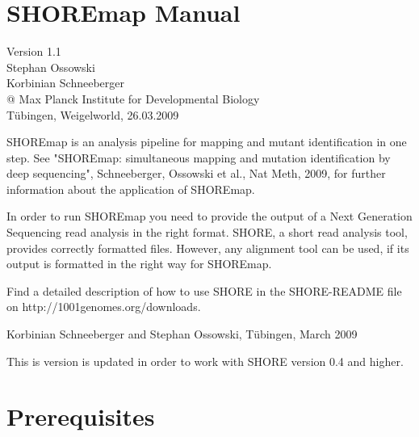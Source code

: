 \documentclass[a4paper,10pt]{scrartcl}
\begin{document}
\parindent 0pt
\parskip 10pt
\setlength{\textheight}{22cm}
\setlength{\headheight}{0.2cm}


\hspace{16cm}
\section*{\centering \huge SHOREmap Manual}
\setcounter{section}{0}
\vspace{.4cm}
\begin{center}
Version 1.1\\[1cm]

Stephan Ossowski\\
Korbinian Schneeberger\\[1cm]


@ Max Planck Institute for Developmental Biology\\
T\"ubingen, Weigelworld, 26.03.2009\\
\end{center}


\newpage
\vspace{.4cm}
\tableofcontents

\newpage

\vspace{.5cm}

SHOREmap is an analysis pipeline for mapping and mutant identification in one step. See "SHOREmap: simultaneous mapping and mutation identification by deep sequencing", Schneeberger, Ossowski et al., Nat Meth, 2009, for further information about the application of SHOREmap.

In order to run SHOREmap you need to provide the output of a Next Generation Sequencing read analysis in the right format. SHORE, a short read analysis tool, provides correctly formatted files. However, any alignment tool can be used, if its output is formatted in the right way for SHOREmap.

Find a detailed description of how to use SHORE in the SHORE-README file on http://1001genomes.org/downloads.

Korbinian Schneeberger and Stephan Ossowski, T\"ubingen, March 2009

This is version is updated in order to work with SHORE version 0.4 and higher.

\newpage

\section{Prerequisites}
\end{document}
